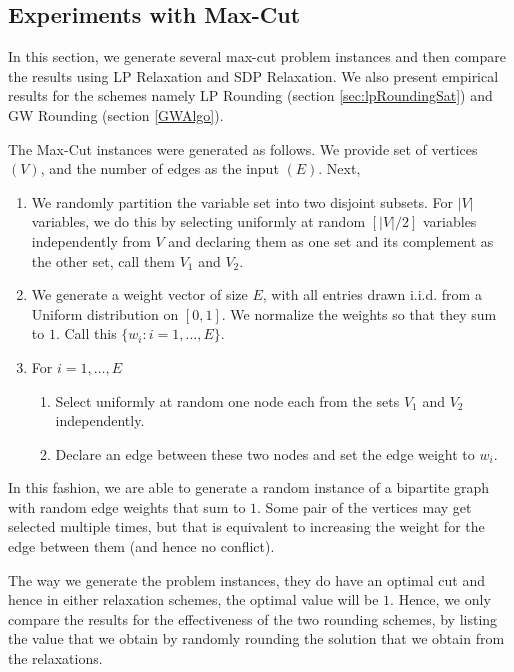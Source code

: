 \subsection{Experiments with Max-Cut}
In this section, we generate several max-cut problem instances and then compare the results using LP Relaxation and SDP Relaxation. We also present empirical results for the schemes namely LP Rounding (section \ref{sec:lpRoundingSat}) and GW Rounding (section \ref{GWAlgo}). 

The Max-Cut instances were generated as follows. We provide set of vertices $(V)$, and the number of edges as the input $(E)$. Next, 
\begin{enumerate}
	\item We randomly partition the variable set into two disjoint subsets. For $|V|$ variables, we do this by selecting uniformly at random $[|V|/2]$ variables independently from $V$ and declaring them as one set and its complement as the other set, call them $V_1$ and $V_2$. 
	\item We generate a weight vector of size $E$, with all entries drawn i.i.d. from a Uniform distribution on $[0, 1]$. We normalize the weights so that they sum to $1$. Call this $\{ w_i : i = 1, \ldots, E\}$.
	\item For $i=1, \ldots, E$ 
	\begin{enumerate}
		\item  Select uniformly at random one node each from the sets $V_1$ and $V_2$ independently. 
		\item Declare an edge between these two nodes and set the edge weight to $w_{i}$.
	\end{enumerate}
\end{enumerate}
In this fashion, we are able to generate a random instance of a bipartite graph with random edge weights that sum to $1$. Some pair of the vertices may get selected multiple times, but that is equivalent to increasing the weight for the edge between them (and hence no conflict).

The way we generate the problem instances, they do have an optimal cut and hence in either relaxation schemes, the optimal value will be $1$. Hence, we only compare the results for the effectiveness of the two rounding schemes, by listing the value that we obtain by randomly rounding the solution that we obtain from the relaxations. 


